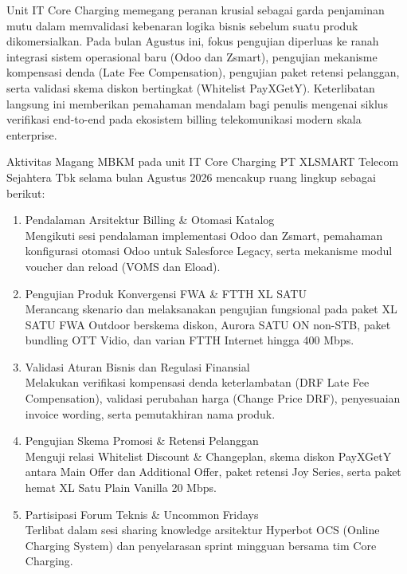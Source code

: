 \documentclass[12pt,a4paper]{article}
\begin{document}
Unit IT Core Charging memegang peranan krusial sebagai garda penjaminan mutu dalam memvalidasi kebenaran logika bisnis sebelum suatu produk dikomersialkan. Pada bulan Agustus ini, fokus pengujian diperluas ke ranah integrasi sistem operasional baru (Odoo dan Zsmart), pengujian mekanisme kompensasi denda (Late Fee Compensation), pengujian paket retensi pelanggan, serta validasi skema diskon bertingkat (Whitelist PayXGetY). Keterlibatan langsung ini memberikan pemahaman mendalam bagi penulis mengenai siklus verifikasi end-to-end pada ekosistem billing telekomunikasi modern skala enterprise.

\vspace{0.3cm}
Aktivitas Magang MBKM pada unit IT Core Charging PT XLSMART Telecom Sejahtera Tbk selama bulan Agustus 2026 mencakup ruang lingkup sebagai berikut:
\begin{enumerate}[label=\arabic*),leftmargin=1.5em,itemsep=1pt,topsep=2pt]
    \item Pendalaman Arsitektur Billing \& Otomasi Katalog\\
    Mengikuti sesi pendalaman implementasi Odoo dan Zsmart, pemahaman konfigurasi otomasi Odoo untuk Salesforce Legacy, serta mekanisme modul voucher dan reload (VOMS dan Eload).
    \item Pengujian Produk Konvergensi FWA \& FTTH XL SATU\\
    Merancang skenario dan melaksanakan pengujian fungsional pada paket XL SATU FWA Outdoor berskema diskon, Aurora SATU ON non-STB, paket bundling OTT Vidio, dan varian FTTH Internet hingga 400 Mbps.
    \item Validasi Aturan Bisnis dan Regulasi Finansial\\
    Melakukan verifikasi kompensasi denda keterlambatan (DRF Late Fee Compensation), validasi perubahan harga (Change Price DRF), penyesuaian invoice wording, serta pemutakhiran nama produk.
    \item Pengujian Skema Promosi \& Retensi Pelanggan\\
    Menguji relasi Whitelist Discount \& Changeplan, skema diskon PayXGetY antara Main Offer dan Additional Offer, paket retensi Joy Series, serta paket hemat XL Satu Plain Vanilla 20 Mbps.
    \item Partisipasi Forum Teknis \& Uncommon Fridays\\
    Terlibat dalam sesi sharing knowledge arsitektur Hyperbot OCS (Online Charging System) dan penyelarasan sprint mingguan bersama tim Core Charging.
\end{enumerate}
\end{document}
